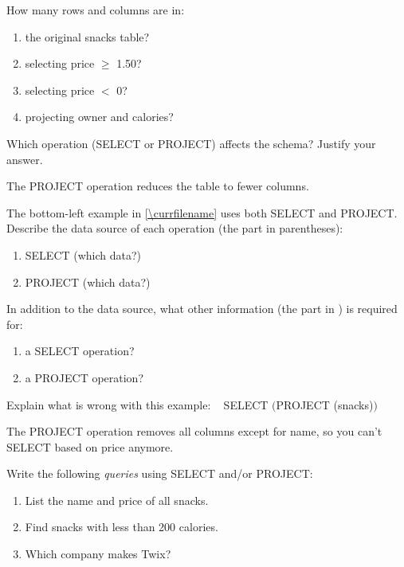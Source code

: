 

\Q How many rows and columns are in:

\begin{enumerate}[itemsep=1ex]
\item the original snacks table? 
\item selecting price $\geq$ 1.50? 
\item selecting price $<$ 0? 
\item projecting owner and calories? 
\end{enumerate}


\Q Which operation (SELECT or PROJECT) affects the schema? Justify your answer.

\begin{answer}
The PROJECT operation reduces the table to fewer columns.
\end{answer}


\Q The bottom-left example in \ref{\currfilename} uses both SELECT and PROJECT.
Describe the data source of each operation (the part in parentheses):

\begin{enumerate}
\item SELECT \sub{\ldots} (which data?) 
\item PROJECT \sub{\ldots} (which data?) 
\end{enumerate}


\Q In addition to the data source, what other information (the part in ) is required for:

\begin{enumerate}
\item a SELECT operation? 
\item a PROJECT operation? 
\end{enumerate}


\Q Explain what is wrong with this example: ~ SELECT  $\big($PROJECT  (snacks)$\big)$

\begin{answer}
The PROJECT operation removes all columns except for name, so you can't SELECT based on price anymore.
\end{answer}


\Q Write the following \emph{queries} using SELECT and/or PROJECT:

\begin{enumerate}
\item List the name and price of all snacks.
\item Find snacks with less than 200 calories.
\item Which company makes Twix?
\end{enumerate}
